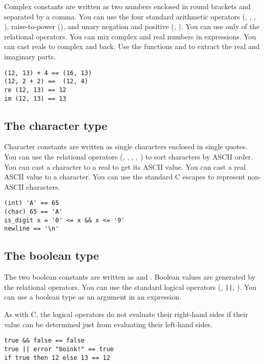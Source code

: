 Complex constants are written as two numbers enclosed in round brackets and
separated by a comma. You can use the four standard arithmetic operators
(\ct{+}, \ct{-}, \ct{*}, \ct{/}), raise-to-power (\ct{**}), and unary negation
and positive (\ct{-}, \ct{+}). You can use \ct{==} only of the relational
operators. You can mix complex and real numbers in expressions. You can cast
reals to complex and back.  Use the functions  and 
to extract the real and imaginary parts.

\begin{verbatim}
(12, 13) + 4 == (16, 13)
(12, 2 + 2) ==  (12, 4)
re (12, 13) == 12
im (12, 13) == 13
\end{verbatim}

\subsection{The character type}

Character constants are written as single characters enclosed in single
quotes. You can use the relational operators (\ct{<}, \ct{<=}, \ct{>},
\ct{>=}, \ct{==}) to sort characters by ASCII order. You can cast a
character to a real to get its ASCII value. You can cast a real ASCII value 
to a character. You can use the standard C escapes to represent non-ASCII
characters.

\begin{verbatim}
(int) 'A' == 65
(char) 65 == 'A'
is_digit x = '0' <= x && x <= '9'
newline == '\n' 
\end{verbatim}

\subsection{The boolean type}

The two boolean constants are written as  and . Boolean
values are generated by the relational operators.  You can use the standard
logical operators (\ct{\&\&}, \verb+||+, \ct{!}). You can use a boolean type
as an argument in an  expression.

As with C, the logical operators do not evaluate their right-hand sides if
their value can be determined just from evaluating their left-hand sides.

\begin{verbatim}
true && false == false
true || error "boink!" == true
if true then 12 else 13 == 12
\end{verbatim}

